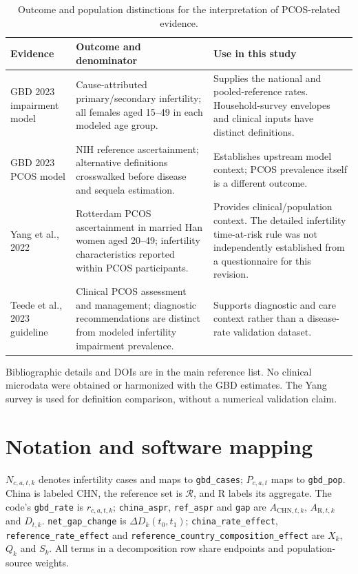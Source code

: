 \documentclass[11pt,a4paper]{article}
\begin{document}
\small
\begin{longtable}{p{}p{}p{}}
\caption{Outcome and population distinctions for the interpretation of PCOS-related evidence.}\label{tab:s11}\\
\toprule Evidence & Outcome and denominator & Use in this study\\\midrule\endhead
GBD 2023 impairment model & Cause-attributed primary/secondary infertility; all females aged 15--49 in each modeled age group. & Supplies the national and pooled-reference rates. Household-survey envelopes and clinical inputs have distinct definitions.\\
GBD 2023 PCOS model & NIH reference ascertainment; alternative definitions crosswalked before disease and sequela estimation. & Establishes upstream model context; PCOS prevalence itself is a different outcome.\\
Yang et al., 2022 & Rotterdam PCOS ascertainment in married Han women aged 20--49; infertility characteristics reported within PCOS participants. & Provides clinical/population context. The detailed infertility time-at-risk rule was not independently established from a questionnaire for this revision.\\
Teede et al., 2023 guideline & Clinical PCOS assessment and management; diagnostic recommendations are distinct from modeled infertility impairment prevalence. & Supports diagnostic and care context rather than a disease-rate validation dataset.\\\bottomrule
\end{longtable}\normalsize
Bibliographic details and DOIs are in the main reference list. No clinical microdata were obtained or harmonized with the GBD estimates. The Yang survey is used for definition comparison, without a numerical validation claim.

\section*{Notation and software mapping}
$N_{c,a,t,k}$ denotes infertility cases and maps to \texttt{gbd\_cases}; $P_{c,a,t}$ maps to \texttt{gbd\_pop}. China is labeled $\mathrm{CHN}$, the reference set is $\mathcal{R}$, and $\mathrm{R}$ labels its aggregate. The code's \texttt{gbd\_rate} is $r_{c,a,t,k}$; \texttt{china\_aspr}, \texttt{ref\_aspr} and \texttt{gap} are $A_{\mathrm{CHN},t,k}$, $A_{\mathrm{R},t,k}$ and $D_{t,k}$. \texttt{net\_gap\_change} is $\Delta D_k(t_0,t_1)$; \texttt{china\_rate\_effect}, \texttt{reference\_rate\_effect} and \texttt{reference\_country\_composition\_effect} are $X_k$, $Q_k$ and $S_k$. All terms in a decomposition row share endpoints and population-source weights.
\end{document}
